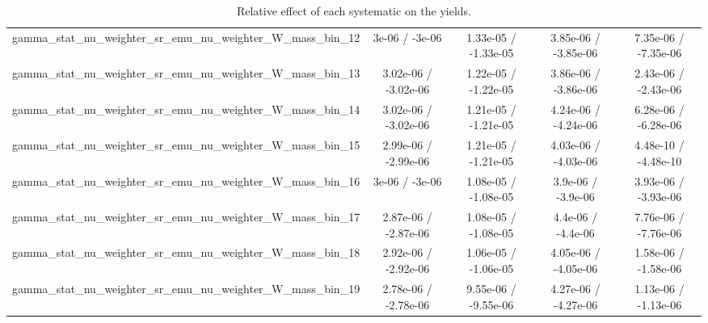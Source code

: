 \documentclass[10pt]{article}
\begin{document}
\begin{table}[htbp]
\begin{center}
\begin{tabular}{|c|c|c|c|c|}
  gamma_stat_nu_weighter_sr_emu_nu_weighter_W_mass_bin_12 & 3e-06 / -3e-06 & 1.33e-05 / -1.33e-05 & 3.85e-06 / -3.85e-06 & 7.35e-06 / -7.35e-06 \\ 
  gamma_stat_nu_weighter_sr_emu_nu_weighter_W_mass_bin_13 & 3.02e-06 / -3.02e-06 & 1.22e-05 / -1.22e-05 & 3.86e-06 / -3.86e-06 & 2.43e-06 / -2.43e-06 \\ 
  gamma_stat_nu_weighter_sr_emu_nu_weighter_W_mass_bin_14 & 3.02e-06 / -3.02e-06 & 1.21e-05 / -1.21e-05 & 4.24e-06 / -4.24e-06 & 6.28e-06 / -6.28e-06 \\ 
  gamma_stat_nu_weighter_sr_emu_nu_weighter_W_mass_bin_15 & 2.99e-06 / -2.99e-06 & 1.21e-05 / -1.21e-05 & 4.03e-06 / -4.03e-06 & 4.48e-10 / -4.48e-10 \\ 
  gamma_stat_nu_weighter_sr_emu_nu_weighter_W_mass_bin_16 & 3e-06 / -3e-06 & 1.08e-05 / -1.08e-05 & 3.9e-06 / -3.9e-06 & 3.93e-06 / -3.93e-06 \\ 
  gamma_stat_nu_weighter_sr_emu_nu_weighter_W_mass_bin_17 & 2.87e-06 / -2.87e-06 & 1.08e-05 / -1.08e-05 & 4.4e-06 / -4.4e-06 & 7.76e-06 / -7.76e-06 \\ 
  gamma_stat_nu_weighter_sr_emu_nu_weighter_W_mass_bin_18 & 2.92e-06 / -2.92e-06 & 1.06e-05 / -1.06e-05 & 4.05e-06 / -4.05e-06 & 1.58e-06 / -1.58e-06 \\ 
  gamma_stat_nu_weighter_sr_emu_nu_weighter_W_mass_bin_19 & 2.78e-06 / -2.78e-06 & 9.55e-06 / -9.55e-06 & 4.27e-06 / -4.27e-06 & 1.13e-06 / -1.13e-06 \\ 
\hline 
\end{tabular} 
\caption{Relative effect of each systematic on the yields.} 
\end{center} 
\end{table} 
\end{document}
